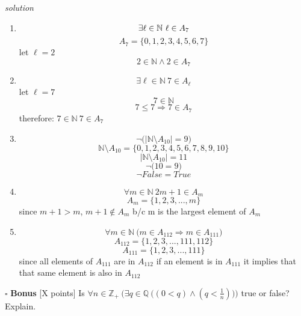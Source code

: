 \documentclass[11pt,twoside]{amsart}
\begin{document}
\emph{solution}

\begin{enumerate}[1)]
		\item  
      
       $$ \exists \ell \in \mathbb{N} \ \ell  \in A_7 \\$$
       $$ A_7 = \{0,1,2,3,4,5,6,7\} $$
       let $\ell = 2$
       $$ 2 \in \mathbb{N} \land 2 \in A_7 $$

    

		\item
     $$\exists \ell \in \mathbb{N} \ 7 \in A_{\ell}$$ 
      let $\ell = 7$ 
      $$7 \in \mathbb{N}$$
      $$7 \leq 7 \Rightarrow 7 \in A_7$$
      therefore: $7 \in \mathbb{N} \ 7 \in A_7$
      
		\item 

      $$\neg \big (| \mathbb{N} \setminus A_{10} | = 9 \big )$$
      $$\mathbb{N} \setminus A_{10} = \{ 0,1,2,3,4,5,6,7,8,9,10 \} $$
      $$|\mathbb{N} \setminus A_{10}| = 11$$
      $$\neg \big( 10 = 9 \big )$$
      $$\neg False = True$$

		\item 
      $$\forall m \in \mathbb{N} \ 2m+1 \in A_m$$
      $$A_m = \{1,2,3,...,m\}$$
      since $m +1 > m$, $m+1 \notin A_m$ b/c m is the largest element of $A_m$ 

		\item 
      $$\forall m \in \mathbb{N} \ \big (m \in A_{112} \Rightarrow m \in A_{111} \big )$$
      $$A_{112} = \{1,2,3,...,111,112\}$$
       $$A_{111} = \{1,2,3,...,111\}$$
     since all elements of $A_{111}$ are in $A_{112}$ if an element is in $A_{111}$ it implies that that same element is also in $A_{112}$

	\end{enumerate}

\newpage
\noindent $\square$ \textbf{Bonus} [X points] Is $\forall n \in \mathbb{Z}_+ \ \Bigg ( \exists q \in \mathbb{Q} \ \Big( (0< q) \land (q <  \frac{1}{n} ) \Big ) \Bigg )$ true or false? Explain. 
\end{document}
